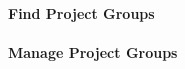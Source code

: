 \paragraph{Find Project Groups}

\paragraph{Manage Project Groups}



\begin{comment}
In the interview described in \appref{sec:lene} we learned that there is a need for having a concept of project groups in \moodle{}.  to enhance communication by sending messages from the \admpers{} to project groups through \moodle{}.
This evolves into two backlog items; integrate the concept of project groups into \moodle{} and allow the administrative personnel to post messages to the project group.
The former is represented as a backlog item which can be seen in \figref{fig:productbacklog}.
The latter is implemented by the \supervisorgroup{}.
\end{comment}


